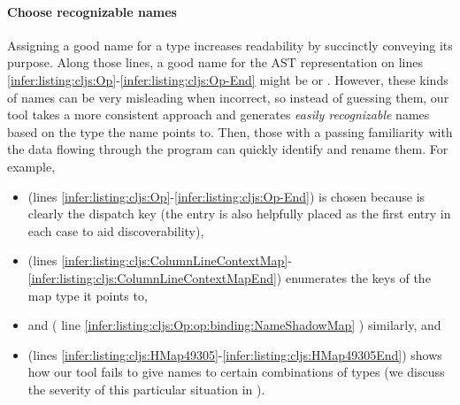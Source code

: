 \paragraph{Choose recognizable names}
Assigning a good name for a type increases
readability by succinctly conveying its purpose.
Along those lines, a good name for the AST representation
on lines \ref{infer:listing:cljs:Op}-\ref{infer:listing:cljs:Op-End}
might be  or .
However, these kinds of names can be very misleading when incorrect, so
instead of guessing them,
our tool takes a more consistent approach and generates \emph{easily recognizable}
names based on the type the name points to.
Then, those with a passing familiarity with the data flowing through the program
can quickly identify and rename them.
For example,
\begin{itemize}
  \item
     (lines \ref{infer:listing:cljs:Op}-\ref{infer:listing:cljs:Op-End})
    is chosen because  is
    clearly the dispatch key (the  entry is also helpfully placed
    as the first entry in each case to aid discoverability),
  \item
     (lines \ref{infer:listing:cljs:ColumnLineContextMap}-\ref{infer:listing:cljs:ColumnLineContextMapEnd})
    enumerates the keys of the map type it points to,
  \item
     and  (%
    line
    \ref{infer:listing:cljs:Op:op:binding:NameShadowMap}%
    )
    similarly, and
  \item
     (lines \ref{infer:listing:cljs:HMap49305}-\ref{infer:listing:cljs:HMap49305End})
    shows how our tool fails to give names to certain combinations
    of types (we discuss the severity of this particular situation in
    ).
\end{itemize}

